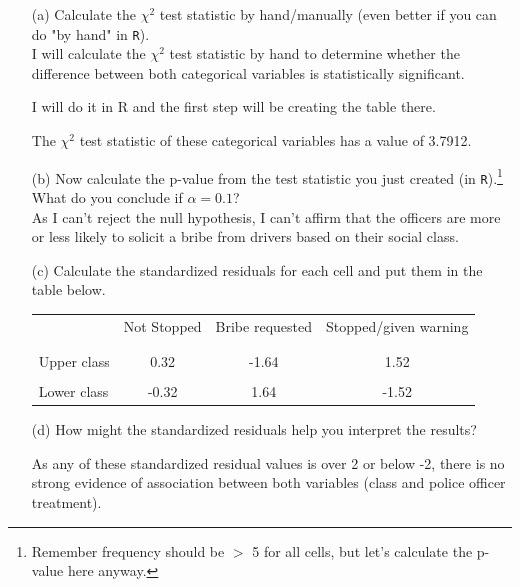 \documentclass[12pt,letterpaper]{article}
\begin{document}
\begin{enumerate}
	
	\item [(a)]
	Calculate the $\chi^2$ test statistic by hand/manually (even better if you can do "by hand" in \texttt{R}).\\
	
	I will calculate the $\chi^2$ test statistic by hand to determine whether the difference between both categorical variables is statistically significant.
	
	I will do it in R and the first step will be creating the table there.
	
	 
	
	The  $\chi^2$ test statistic of these categorical variables has a value of 3.7912.
	
	\vspace{1cm}
	\item [(b)]
	Now calculate the p-value from the test statistic you just created (in \texttt{R}).\footnote{Remember frequency should be $>$ 5 for all cells, but let's calculate the p-value here anyway.}  What do you conclude if $\alpha = 0.1$?\\
	
		 
	
	As I can't reject the null hypothesis, I can't affirm that the officers are more or less likely to solicit a bribe from drivers based on their social class.
	
	\newpage
	\item [(c)] Calculate the standardized residuals for each cell and put them in the table below.
	\vspace{1cm}
	
	 
	
	\begin{table}[h]
		\centering
		\begin{tabular}{l | c c c }
			& Not Stopped & Bribe requested & Stopped/given warning \\
			\\[-1.8ex] 
			\hline \\[-1.8ex]
			Upper class  &0.32  &-1.64  &1.52  \\
			\\
			Lower class &-0.32  &1.64   &-1.52   \\
			
		\end{tabular}
	\end{table}
	
	
	\vspace{1cm}
	\item [(d)] How might the standardized residuals help you interpret the results? 
	
	As any of these standardized residual values is over 2 or below -2, there is no strong evidence of association between both variables (class and police officer treatment).
	
\end{enumerate}
\newpage
\end{document}
